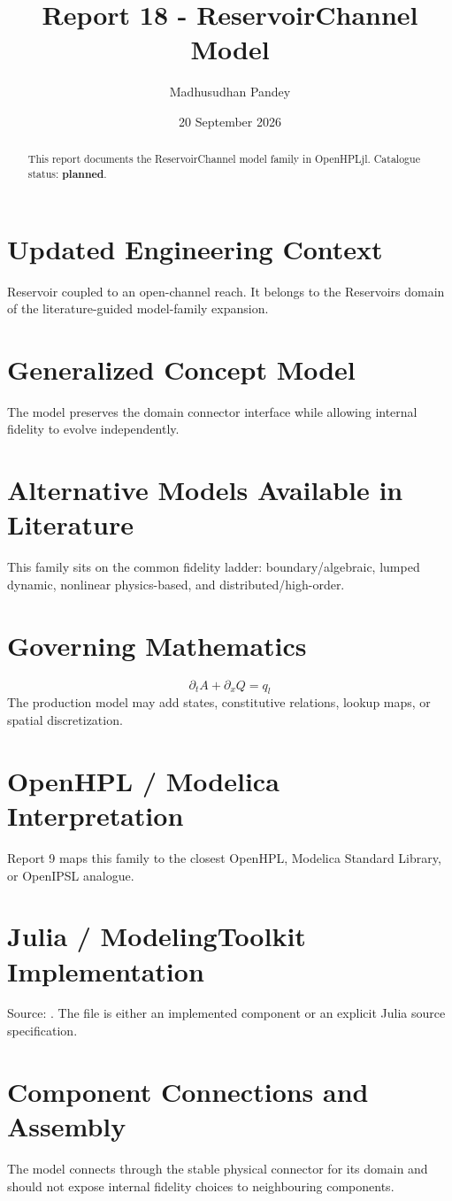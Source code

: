 \documentclass[10pt,a4paper]{article}
\title{Report 18 - ReservoirChannel Model}
\author{Madhusudhan Pandey}
\date{20 September 2026}
\begin{document}
\maketitle
\begin{abstract}
This report documents the ReservoirChannel model family in OpenHPLjl. Catalogue status: \textbf{planned}.
\end{abstract}
\section{Updated Engineering Context}
Reservoir coupled to an open-channel reach. It belongs to the Reservoirs domain of the literature-guided model-family expansion.
\section{Generalized Concept Model}
The model preserves the domain connector interface while allowing internal fidelity to evolve independently.
\section{Alternative Models Available in Literature}
This family sits on the common fidelity ladder: boundary/algebraic, lumped dynamic, nonlinear physics-based, and distributed/high-order.
\section{Governing Mathematics}
\[\partial_t A+\partial_x Q=q_l\]
The production model may add states, constitutive relations, lookup maps, or spatial discretization.
\section{OpenHPL / Modelica Interpretation}
Report 9 maps this family to the closest OpenHPL, Modelica Standard Library, or OpenIPSL analogue.
\section{Julia / ModelingToolkit Implementation}
Source: \texttt{}. The file is either an implemented component or an explicit Julia source specification.
\section{Component Connections and Assembly}
The model connects through the stable physical connector for its domain and should not expose internal fidelity choices to neighbouring components.
\end{document}
